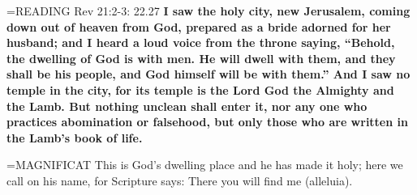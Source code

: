 \hangindent=\parindent \small{READING} Rev 21:2-3: 22.27 \textbf{I saw the holy city, new Jerusalem, coming down out of heaven from God, prepared as a bride adorned for her husband; and I heard a loud voice from the throne saying, “Behold, the dwelling of God is with men. He will dwell with them, and they shall be his people, and God himself will be with them.” And I saw no temple in the city, for its temple is the Lord God the Almighty and the Lamb. But nothing unclean shall enter it, nor any one who practices abomination or falsehood, but only those who are written in the Lamb’s book of life.  \\}

\hangindent=\parindent \small{MAGNIFICAT  This is God’s dwelling place and he has made it holy; here we call on his name, for Scripture says: There you will find me (alleluia).\\}
